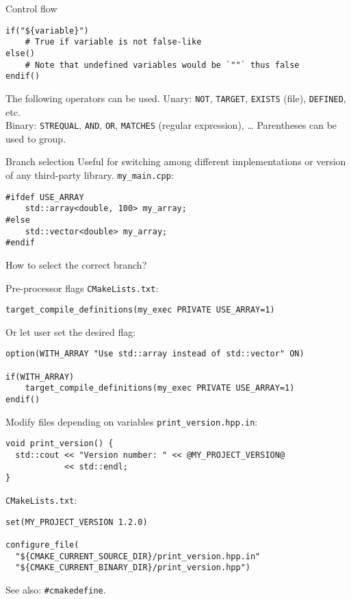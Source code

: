 \documentclass[aspectratio=169,11pt]{beamer}
\begin{document}
\begin{frame}[fragile]{Control flow}
\begin{verbatim}
if("${variable}")
    # True if variable is not false-like
else()
    # Note that undefined variables would be `""` thus false
endif()
\end{verbatim}
\vfill
The following operators can be used.
\vfill
Unary: \texttt{NOT}, \texttt{TARGET}, \texttt{EXISTS} (file), \texttt{DEFINED}, etc.\\
Binary: \texttt{STREQUAL}, \texttt{AND}, \texttt{OR}, \texttt{MATCHES} (regular expression), \dots
\vfill
Parentheses can be used to group.
\end{frame}

\begin{frame}[fragile]{Branch selection}
Useful for switching among different implementations or version of any third-party library.
\vfill
\texttt{my\_main.cpp}:
\begin{verbatim}
#ifdef USE_ARRAY
    std::array<double, 100> my_array;
#else
    std::vector<double> my_array;
#endif
\end{verbatim}

How to select the correct branch?
\end{frame}

\begin{frame}[fragile]{Pre-processor flags}
\texttt{CMakeLists.txt}:
\begin{verbatim}
target_compile_definitions(my_exec PRIVATE USE_ARRAY=1)
\end{verbatim}
Or let user set the desired flag:
\begin{verbatim}
option(WITH_ARRAY "Use std::array instead of std::vector" ON)

if(WITH_ARRAY)
    target_compile_definitions(my_exec PRIVATE USE_ARRAY=1)
endif()
\end{verbatim}
\end{frame}

\begin{frame}[fragile]{Modify files depending on variables}
\texttt{print\_version.hpp.in}:
\begin{verbatim}
void print_version() {
  std::cout << "Version number: " << @MY_PROJECT_VERSION@
            << std::endl;
}
\end{verbatim}
\texttt{CMakeLists.txt}:
\begin{verbatim}
set(MY_PROJECT_VERSION 1.2.0)

configure_file(
  "${CMAKE_CURRENT_SOURCE_DIR}/print_version.hpp.in"
  "${CMAKE_CURRENT_BINARY_DIR}/print_version.hpp")
\end{verbatim}
See also: \texttt{\#cmakedefine}.
\end{frame}
\end{document}
